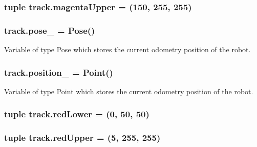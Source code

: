 \subsubsection[{\texorpdfstring{magenta\+Upper}{magentaUpper}}]{\setlength{\rightskip}{0pt plus 5cm}tuple track.\+magenta\+Upper = (150, 255, 255)}\hypertarget{namespacetrack_a159d6ddb51827712e530f1f1e59369c7}{}\label{namespacetrack_a159d6ddb51827712e530f1f1e59369c7}
\subsubsection[{\texorpdfstring{pose\+\_\+}{pose_}}]{\setlength{\rightskip}{0pt plus 5cm}track.\+pose\+\_\+ = Pose()}\hypertarget{namespacetrack_a4fcc239004d2df0fe5a4ea23c9b0495f}{}\label{namespacetrack_a4fcc239004d2df0fe5a4ea23c9b0495f}


Variable of type Pose which stores the current odometry position of the robot. 

\subsubsection[{\texorpdfstring{position\+\_\+}{position_}}]{\setlength{\rightskip}{0pt plus 5cm}track.\+position\+\_\+ = Point()}\hypertarget{namespacetrack_a7299b48bcf1df87418078ead7079339d}{}\label{namespacetrack_a7299b48bcf1df87418078ead7079339d}


Variable of type Point which stores the current odometry position of the robot. 

\subsubsection[{\texorpdfstring{red\+Lower}{redLower}}]{\setlength{\rightskip}{0pt plus 5cm}tuple track.\+red\+Lower = (0, 50, 50)}\hypertarget{namespacetrack_a760fae991a015aa4ee4c08fcaadeb576}{}\label{namespacetrack_a760fae991a015aa4ee4c08fcaadeb576}
\subsubsection[{\texorpdfstring{red\+Upper}{redUpper}}]{\setlength{\rightskip}{0pt plus 5cm}tuple track.\+red\+Upper = (5, 255, 255)}\hypertarget{namespacetrack_a1549403b0cb47b249afba9cdeca7ec16}{}\label{namespacetrack_a1549403b0cb47b249afba9cdeca7ec16}
